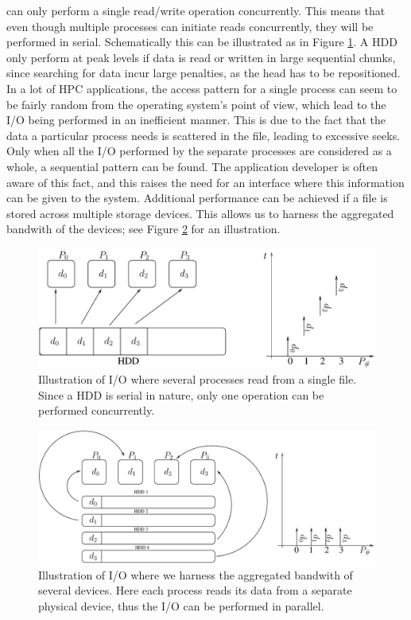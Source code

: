 \documentclass[twoside, 11pt, a4paper]{article}
\begin{document}
can only perform a single read/write operation concurrently. 
This means that even though multiple processes can initiate reads concurrently,
they will be performed in serial. Schematically this can be illustrated as in Figure \ref{fig:manyone}.
A HDD only perform at peak levels if data is read or written in large sequential chunks,
since searching for data incur large penalties, as the head has to be repositioned.
In a lot of HPC applications, the access pattern for a single process can seem to
be fairly random from the operating system's point of view, which lead to the I/O being
performed in an inefficient manner. This is due to the fact that the data a particular
process needs is scattered in the file, leading to excessive seeks.
Only when all the I/O performed by the separate processes are considered as a whole,
a sequential pattern can be found. The application developer is often aware of this fact,
and this raises the need for an interface where this information can be given to the 
system. Additional performance can be achieved if a file is stored across multiple 
storage devices. This allows us to harness the aggregated bandwith of the devices;
see Figure \ref{fig:manymany} for an illustration.

\begin{figure}[ht]
	\begin{center}
		\includegraphics[width=12cm]{many-onedisk}
	\end{center}
	\caption{Illustration of I/O where several processes read from a single file.
			 Since a HDD is serial in nature, only one operation can be performed
			 concurrently.}
	\label{fig:manyone}
\end{figure}
\begin{figure}[ht]
	\begin{center}
		\includegraphics[width=12cm]{many-manydisk}
	\end{center}
	\caption{Illustration of I/O where we harness the aggregated bandwith of
			 several devices. Here each process reads its data from a separate
			 physical device, thus the I/O can be performed in parallel.}
	\label{fig:manymany}
\end{figure}
\end{document}
